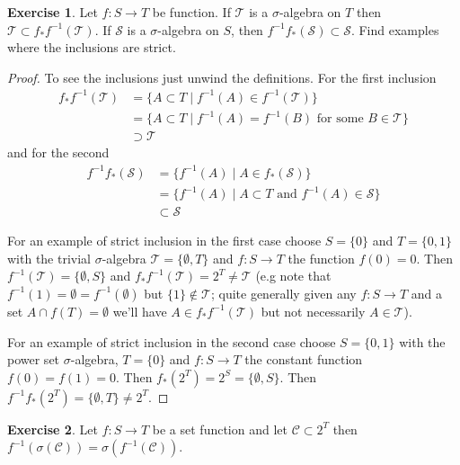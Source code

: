 \documentclass{amsbook}
\theoremstyle{definition}
\newtheorem{xca}{Exercise}
\theoremstyle{remark}
\begin{document}
\begin{xca}Let $f : S \to T$ be function.  If $\mathcal{T}$ is a
  $\sigma$-algebra on $T$ then $\mathcal{T} \subset f_*
  f^{-1}(\mathcal{T})$.  If $\mathcal{S}$ is a $\sigma$-algebra on
  $S$, then $f^{-1}f_*(\mathcal{S}) \subset \mathcal{S}$.  Find examples where the inclusions are strict.
\end{xca}
\begin{proof}
To see the inclusions just unwind the definitions.  For the first inclusion
\begin{align*}
f_* f^{-1}(\mathcal{T}) &= \lbrace A \subset T \mid f^{-1}(A) \in
f^{-1}(\mathcal{T}) \rbrace \\
&= \lbrace A \subset T \mid f^{-1}(A) =
f^{-1}(B) \text { for some } B \in \mathcal{T} \rbrace \\
&\supset \mathcal{T}
\end{align*}
and for the second
\begin{align*}
f^{-1} f_* (\mathcal{S}) &= \lbrace f^{-1}(A) \mid A \in  f_*
(\mathcal{S}) \rbrace \\
&= \lbrace f^{-1}(A) \mid A \subset T \text{ and } f^{-1}(A) \in
\mathcal{S} \rbrace \\
&\subset \mathcal{S}
\end{align*}

For an example of strict inclusion in the first case choose $S =\lbrace 0 \rbrace$ and $T = \lbrace 0,1  \rbrace$ with the
trivial $\sigma$-algebra $\mathcal{T} = \lbrace \emptyset, T \rbrace$ and $f : S \to T$ the function $f(0) = 0$.  Then 
$f^{-1} (\mathcal{T}) = \lbrace \emptyset, S \rbrace$ and $f_* f^{-1} (\mathcal{T}) = 2^T \neq \mathcal{T}$ (e.g note that
$f^{-1} (1) = \emptyset = f^{-1} (\emptyset)$ but $\lbrace 1 \rbrace \notin \mathcal{T}$; quite generally given any $f : S \to T$ and a
set $A \cap f(T) = \emptyset$ we'll have $A \in f_* f^{-1} (\mathcal{T})$ but not necessarily $A \in \mathcal{T}$).

For an example of strict inclusion in the second case choose $S =\lbrace 0, 1 \rbrace$ with the 
power set $\sigma$-algebra, $T = \lbrace 0 \rbrace$ and $f : S \to T$ the constant function $f(0) = f(1) = 0$.  
Then $f_* (2^T) = 2^S = \lbrace \emptyset, S \rbrace$.  Then $f^{-1} f_*(2^T) = \lbrace \emptyset, T \rbrace \neq 2^T$.
\end{proof}
\begin{xca}\label{PullbackGeneratingSet}Let $f : S \to T$ be a set function and let $\mathcal{C}
  \subset 2^T$ then $f^{-1}(\sigma(\mathcal{C})) = \sigma(f^{-1}(\mathcal{C}))$.
\end{xca}
\end{document}

